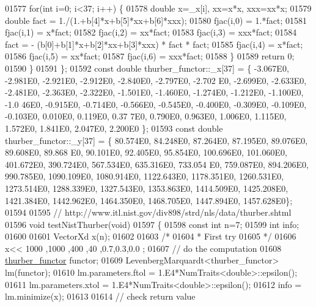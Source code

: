 \begin{DoxyCode}
01577         \textcolor{keywordflow}{for}(\textcolor{keywordtype}{int} i=0; i<37; i++) \{
01578             \textcolor{keywordtype}{double} x=\_x[i], xx=x*x, xxx=xx*x;
01579             \textcolor{keywordtype}{double} fact = 1./(1.+b[4]*x+b[5]*xx+b[6]*xxx);
01580             fjac(i,0) = 1.*fact;
01581             fjac(i,1) = x*fact;
01582             fjac(i,2) = xx*fact;
01583             fjac(i,3) = xxx*fact;
01584             fact = - (b[0]+b[1]*x+b[2]*xx+b[3]*xxx) * fact * fact;
01585             fjac(i,4) = x*fact;
01586             fjac(i,5) = xx*fact;
01587             fjac(i,6) = xxx*fact;
01588         \}
01589         \textcolor{keywordflow}{return} 0;
01590     \}
01591 \};
01592 \textcolor{keyword}{const} \textcolor{keywordtype}{double} thurber\_functor::\_x[37] = \{ -3.067E0, -2.981E0, -2.921E0, -2.912E0, -2.840E0, -2.797E0, -2.702
      E0, -2.699E0, -2.633E0, -2.481E0, -2.363E0, -2.322E0, -1.501E0, -1.460E0, -1.274E0, -1.212E0, -1.100E0, -1.0
      46E0, -0.915E0, -0.714E0, -0.566E0, -0.545E0, -0.400E0, -0.309E0, -0.109E0, -0.103E0, 0.010E0, 0.119E0, 0.37
      7E0, 0.790E0, 0.963E0, 1.006E0, 1.115E0, 1.572E0, 1.841E0, 2.047E0, 2.200E0 \};
01593 \textcolor{keyword}{const} \textcolor{keywordtype}{double} thurber\_functor::\_y[37] = \{ 80.574E0, 84.248E0, 87.264E0, 87.195E0, 89.076E0, 89.608E0, 89.868
      E0, 90.101E0, 92.405E0, 95.854E0, 100.696E0, 101.060E0, 401.672E0, 390.724E0, 567.534E0, 635.316E0, 733.054
      E0, 759.087E0, 894.206E0, 990.785E0, 1090.109E0, 1080.914E0, 1122.643E0, 1178.351E0, 1260.531E0, 1273.514E0, 
      1288.339E0, 1327.543E0, 1353.863E0, 1414.509E0, 1425.208E0, 1421.384E0, 1442.962E0, 1464.350E0, 1468.705E0, 
      1447.894E0, 1457.628E0\};
01594 
01595 \textcolor{comment}{// http://www.itl.nist.gov/div898/strd/nls/data/thurber.shtml}
01596 \textcolor{keywordtype}{void} testNistThurber(\textcolor{keywordtype}{void})
01597 \{
01598   \textcolor{keyword}{const} \textcolor{keywordtype}{int} n=7;
01599   \textcolor{keywordtype}{int} info;
01600 
01601   VectorXd x(n);
01602 
01603   \textcolor{comment}{/*}
01604 \textcolor{comment}{   * First try}
01605 \textcolor{comment}{   */}
01606   x<< 1000 ,1000 ,400 ,40 ,0.7,0.3,0.0 ;
01607   \textcolor{comment}{// do the computation}
01608   \hyperlink{structthurber__functor}{thurber\_functor} functor;
01609   LevenbergMarquardt<thurber\_functor> lm(functor);
01610   lm.parameters.ftol = 1.E4*NumTraits<double>::epsilon();
01611   lm.parameters.xtol = 1.E4*NumTraits<double>::epsilon();
01612   info = lm.minimize(x);
01613 
01614   \textcolor{comment}{// check return value}

\end{DoxyCode}
